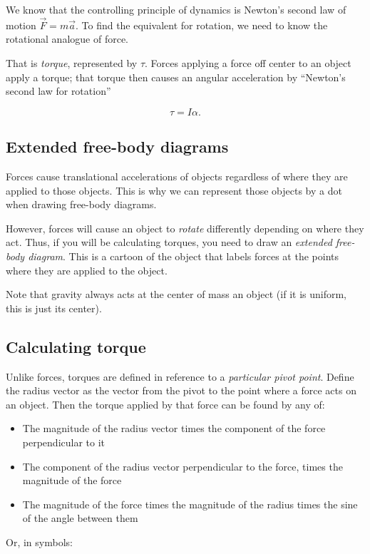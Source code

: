 \documentclass[10pt]{article}
\begin{document}
We know that the controlling principle of dynamics is Newton's second law of motion $\vec F = m\vec a$. To find the equivalent for rotation, we need to know the rotational analogue of force.

That is {\it torque}, represented by $\tau$. Forces applying a force off center to an object apply a torque; that torque then causes an angular acceleration by ``Newton's second law for rotation''

$$\tau = I \alpha.$$

\subsection{Extended free-body diagrams}

Forces cause translational accelerations of objects regardless of where they are applied to those objects. This is why we can represent those objects by a dot when drawing free-body diagrams.

However, forces will cause an object to {\it rotate} differently depending on where they act. Thus, if you will be calculating torques, you need to draw an {\it extended free-body diagram}. This is a cartoon of the object that labels forces at the points where they are applied to the object.

Note that gravity always acts at the center of mass an object (if it is uniform, this is just its center).

\subsection{Calculating torque}

Unlike forces, torques are defined in reference to a {\it particular pivot point}. Define the radius vector as the vector from the pivot to the point where a force acts on an object. Then the torque applied by that force can be found by any of:

\begin{itemize}
	\item The magnitude of the radius vector times the component of the force perpendicular to it
	\item The component of the radius vector perpendicular to the force, times the magnitude of the force
	\item The magnitude of the force times the magnitude of the radius times the sine of the angle between them
	\end{itemize}

Or, in symbols:
\end{document}
